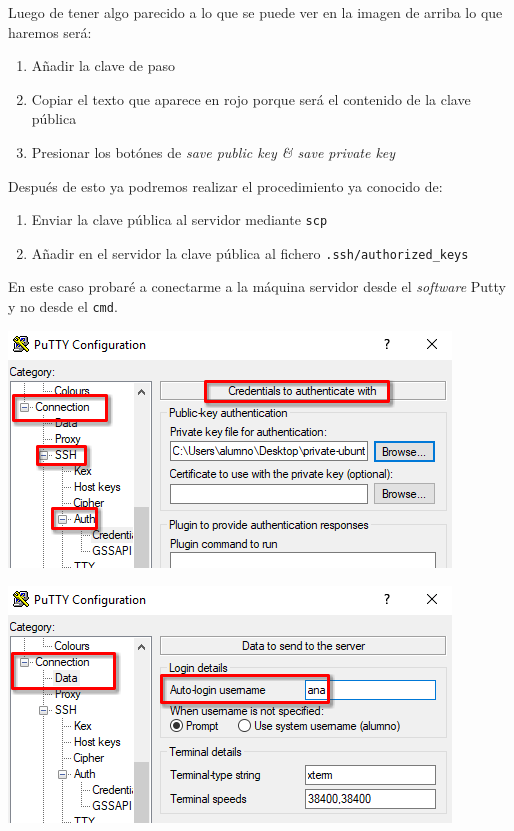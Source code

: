 \documentclass[11pt]{article}
\begin{document}
Luego de tener algo parecido a lo que se puede ver en la imagen de arriba lo que haremos será:
\begin{enumerate}
\item Añadir la clave de paso
\item Copiar el texto que aparece en rojo porque será el contenido de la clave pública
\item Presionar los botónes de \emph{save public key \& save private key}
\end{enumerate}

Después de esto ya podremos realizar el procedimiento ya conocido de:
\begin{enumerate}
\item Enviar la clave pública al servidor mediante \texttt{scp}
\item Añadir en el servidor la clave pública al fichero \texttt{.ssh/authorized\_keys}
\end{enumerate}

En este caso probaré a conectarme a la máquina servidor desde el \emph{software} Putty y no desde el \texttt{cmd}.

\begin{center}
\includegraphics[width=.9\linewidth]{./media/putty-connect.png}
\end{center}

\begin{center}
\includegraphics[width=.9\linewidth]{./media/putty-connect-2.png}
\end{center}
\end{document}
